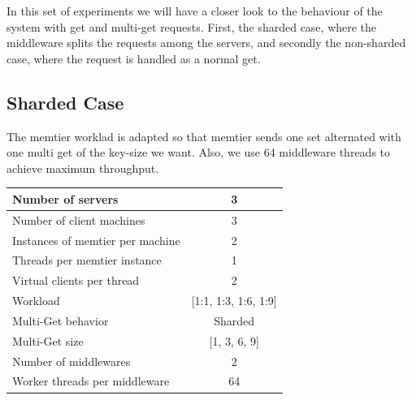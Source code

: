 \documentclass[11pt,a4paper]{article}
\begin{document}
In this set of experiments we will have a closer look to the behaviour of the system with get and multi-get requests. First, the sharded case, where the middleware splits the requests among the servers, and secondly the non-sharded case, where the request is handled as a normal get. 

\subsection{Sharded Case}
The memtier worklad is adapted so that memtier sends one set alternated with one multi get of the key-size we want. Also, we use 64 middleware threads to achieve maximum throughput. 

\begin{center}
	\scriptsize{
		\begin{tabular}{|l|c|}
			\hline Number of servers                & 3                       \\ 
			\hline Number of client machines        & 3                       \\ 
			\hline Instances of memtier per machine & 2                       \\ 
			\hline Threads per memtier instance     & 1                       \\
			\hline Virtual clients per thread       & 2     		            \\ 
			\hline Workload                         & [1:1, 1:3, 1:6, 1:9]           \\
			\hline Multi-Get behavior               & Sharded                \\
			\hline Multi-Get size                   & [1, 3, 6, 9]                  \\
			\hline Number of middlewares            & 2                       \\
			\hline Worker threads per middleware    & 64 \\
			\hline 
		\end{tabular}
	} 
\end{center}
\end{document}
